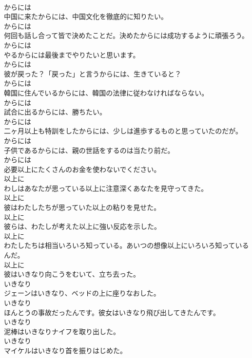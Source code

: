 \documentclass[8pt]{extreport}
\begin{document}
\begin{CJK}{UTF8}{min}
\\	からには	
\\	中国に来たからには、中国文化を徹底的に知りたい。	
\\	からには	
\\	何回も話し合って皆で決めたことだ。決めたからには成功するように頑張ろう。	
\\	からには	
\\	やるからには最後までやりたいと思います。	
\\	からには	
\\	彼が戻った？「戻った」と言うからには、生きていると？	
\\	からには	
\\	韓国に住んでいるからには、韓国の法律に従わなければならない。	
\\	からには	
\\	試合に出るからには、勝ちたい。	
\\	からには	
\\	二ヶ月以上も特訓をしたからには、少しは進歩するものと思っていたのだが。	
\\	からには	
\\	子供であるからには、親の世話をするのは当たり前だ。	
\\	からには	
\\	必要以上にたくさんのお金を使わないでください。	
\\	以上に	
\\	わしはあなたが思っている以上に注意深くあなたを見守ってきた。	
\\	以上に	
\\	彼はわたしたちが思っていた以上の粘りを見せた。	
\\	以上に	
\\	彼らは、わたしが考えた以上に強い反応を示した。	
\\	以上に	
\\	わたしたちは相当いろいろ知っている。あいつの想像以上にいろいろ知っているんだ。	
\\	以上に	
\\	彼はいきなり向こうをむいて、立ち去った。	
\\	いきなり	
\\	ジェーンはいきなり、ベッドの上に座りなおした。	
\\	いきなり	
\\	ほんとうの事故だったんです。彼女はいきなり飛び出してきたんです。	
\\	いきなり	
\\	泥棒はいきなりナイフを取り出した。	
\\	いきなり	
\\	マイケルはいきなり首を振りはじめた。	

\end{CJK}
\end{document}
